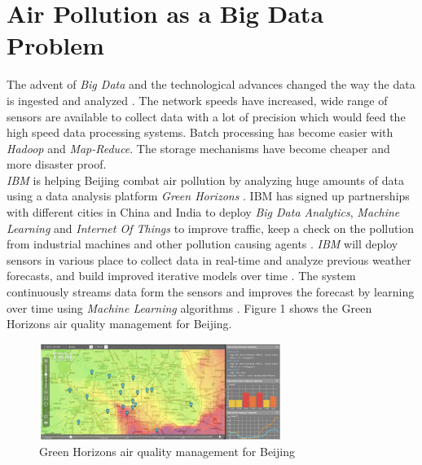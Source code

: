 \documentclass[sigconf]{acmart}
\begin{document}
\section{Air Pollution as a Big Data Problem}
The advent of {\em Big Data} and the technological advances changed the way the data is ingested and analyzed \cite{www-ibm1}. The network speeds have increased, wide range of sensors are available to collect data with a lot of precision which would feed the high speed data processing systems. Batch processing has become easier with {\em Hadoop} and {\em Map-Reduce}. The storage mechanisms have become cheaper and more disaster proof. \\
{\em IBM} is helping Beijing combat air pollution by analyzing huge amounts of data using a data analysis platform {\em Green Horizons} \cite{www-huff}. IBM has signed up partnerships with different cities in China and India to deploy {\em Big Data Analytics}, {\em Machine Learning} and {\em Internet Of Things} to improve traffic, keep a check on the pollution from industrial machines and other pollution causing agents \cite{www-huff}. {\em IBM} will deploy sensors in various place to collect data in real-time and analyze previous weather forecasts, and build improved iterative models over time \cite{www-huff}. The system continuously streams data form the sensors and improves the forecast by learning over time using {\em Machine Learning} algorithms \cite{www-huff}. Figure 1 shows the Green Horizons air quality management for Beijing.

\begin{figure}
\includegraphics[width=0.7\textwidth]{images/fig1.png}
\caption{Green Horizons air quality management for Beijing \cite{www-huff}}
\end{figure}
\end{document}
